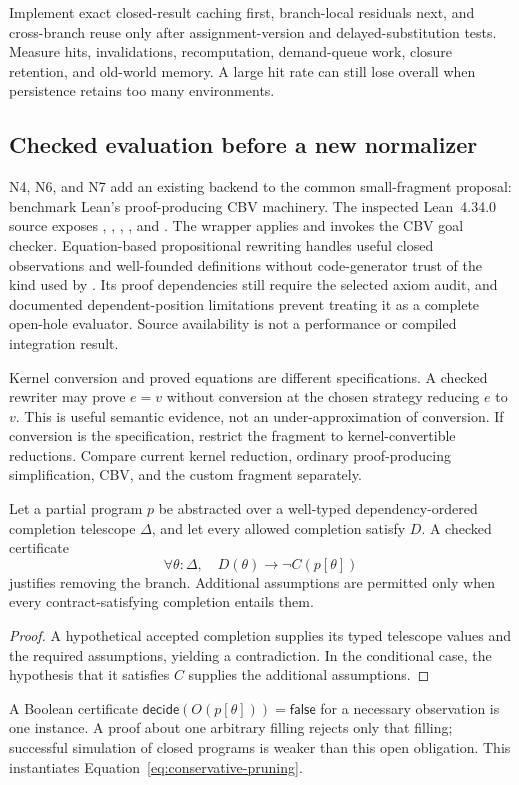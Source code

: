 Implement exact closed-result caching first, branch-local residuals next,
and cross-branch reuse only after assignment-version and delayed-substitution
tests. Measure hits, invalidations, recomputation, demand-queue work, closure
retention, and old-world memory. A large hit rate can still lose overall when
persistence retains too many environments.

\subsection{Checked evaluation before a new normalizer}\label{sec:evaluation-certification}

N4, N6, and N7 add an existing backend to the common small-fragment proposal:
benchmark Lean's proof-producing CBV machinery. The inspected Lean~4.34.0 source
exposes , , ,
, and . The  wrapper applies
 and invokes the CBV goal checker. Equation-based
propositional rewriting handles useful closed observations and well-founded
definitions without code-generator trust of the kind used by
. Its proof dependencies still require the selected axiom
audit, and documented dependent-position limitations prevent treating it as
a complete open-hole evaluator. Source availability is not a performance or
compiled integration result.\cite{leancbv,leantactics}

Kernel conversion and proved equations are different specifications. A checked
rewriter may prove $e=v$ without conversion at the chosen strategy reducing
$e$ to $v$. This is useful semantic evidence, not an under-approximation of
conversion. If conversion is the specification, restrict the fragment to
kernel-convertible reductions. Compare current kernel reduction, ordinary
proof-producing simplification, CBV, and the custom fragment separately.

\begin{proposition}\label{prop:evaluation-refutation}
Let a partial program $p$ be abstracted over a well-typed dependency-ordered
completion telescope $\Delta$, and let every allowed completion satisfy $D$.
A checked certificate
\[
 \forall\theta:\Delta,\quad D(\theta)\to\neg C(p[\theta])
\]
justifies removing the branch. Additional assumptions are permitted only when
every contract-satisfying completion entails them.
\end{proposition}
\begin{proof}
A hypothetical accepted completion supplies its typed telescope values and
the required assumptions, yielding a contradiction. In the conditional case,
the hypothesis that it satisfies $C$ supplies the additional assumptions.
\end{proof}
A Boolean certificate
$\mathsf{decide}(O(p[\theta]))=\mathsf{false}$ for a necessary observation is
one instance. A proof about one arbitrary filling rejects only that filling;
successful simulation of closed programs is weaker than this open obligation.
This instantiates Equation~\ref{eq:conservative-pruning}.

